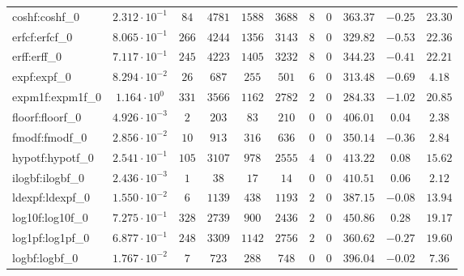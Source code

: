 \begin{tabular}{|l|c|c|c|c|c|c|c|c|c|c|}
coshf:coshf\_0               & $ 2.312 \cdot 10^{-1} $ & $ 84     $ & $ 4781  $ & $ 1588  $ & $ 3688  $ & $ 8   $ & $ 0 $ & $ 363.37      $ & $ -0.25   $ & $ 23.30   $ \\
erfcf:erfcf\_0               & $ 8.065 \cdot 10^{-1} $ & $ 266    $ & $ 4244  $ & $ 1356  $ & $ 3143  $ & $ 8   $ & $ 0 $ & $ 329.82      $ & $ -0.53   $ & $ 22.36   $ \\
erff:erff\_0                 & $ 7.117 \cdot 10^{-1} $ & $ 245    $ & $ 4223  $ & $ 1405  $ & $ 3232  $ & $ 8   $ & $ 0 $ & $ 344.23      $ & $ -0.41   $ & $ 22.21   $ \\
expf:expf\_0                 & $ 8.294 \cdot 10^{-2} $ & $ 26     $ & $ 687   $ & $ 255   $ & $ 501   $ & $ 6   $ & $ 0 $ & $ 313.48      $ & $ -0.69   $ & $ 4.18    $ \\
expm1f:expm1f\_0             & $ 1.164 \cdot 10^{0}  $ & $ 331    $ & $ 3566  $ & $ 1162  $ & $ 2782  $ & $ 2   $ & $ 0 $ & $ 284.33      $ & $ -1.02   $ & $ 20.85   $ \\
floorf:floorf\_0             & $ 4.926 \cdot 10^{-3} $ & $ 2      $ & $ 203   $ & $ 83    $ & $ 210   $ & $ 0   $ & $ 0 $ & $ 406.01      $ & $ 0.04    $ & $ 2.38    $ \\
fmodf:fmodf\_0               & $ 2.856 \cdot 10^{-2} $ & $ 10     $ & $ 913   $ & $ 316   $ & $ 636   $ & $ 0   $ & $ 0 $ & $ 350.14      $ & $ -0.36   $ & $ 2.84    $ \\
hypotf:hypotf\_0             & $ 2.541 \cdot 10^{-1} $ & $ 105    $ & $ 3107  $ & $ 978   $ & $ 2555  $ & $ 4   $ & $ 0 $ & $ 413.22      $ & $ 0.08    $ & $ 15.62   $ \\
ilogbf:ilogbf\_0             & $ 2.436 \cdot 10^{-3} $ & $ 1      $ & $ 38    $ & $ 17    $ & $ 14    $ & $ 0   $ & $ 0 $ & $ 410.51      $ & $ 0.06    $ & $ 2.12    $ \\
ldexpf:ldexpf\_0             & $ 1.550 \cdot 10^{-2} $ & $ 6      $ & $ 1139  $ & $ 438   $ & $ 1193  $ & $ 2   $ & $ 0 $ & $ 387.15      $ & $ -0.08   $ & $ 13.94   $ \\
log10f:log10f\_0             & $ 7.275 \cdot 10^{-1} $ & $ 328    $ & $ 2739  $ & $ 900   $ & $ 2436  $ & $ 2   $ & $ 0 $ & $ 450.86      $ & $ 0.28    $ & $ 19.17   $ \\
log1pf:log1pf\_0             & $ 6.877 \cdot 10^{-1} $ & $ 248    $ & $ 3309  $ & $ 1142  $ & $ 2756  $ & $ 2   $ & $ 0 $ & $ 360.62      $ & $ -0.27   $ & $ 19.60   $ \\
logbf:logbf\_0               & $ 1.767 \cdot 10^{-2} $ & $ 7      $ & $ 723   $ & $ 288   $ & $ 748   $ & $ 0   $ & $ 0 $ & $ 396.04      $ & $ -0.02   $ & $ 7.36    $ \\

\end{tabular}
